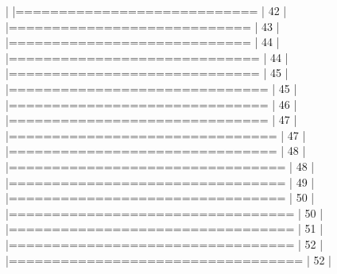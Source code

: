 \documentclass[10pt]{article}
\newenvironment{CodeChunk}{}{}
\begin{document}
\begin{CodeChunk}
\begin{CodeChunk}
\begin{CodeOutput}
  |                                                                       
  |============================                                     |  42%
  |                                                                       
  |============================                                     |  43%
  |                                                                       
  |============================                                     |  44%
  |                                                                       
  |=============================                                    |  44%
  |                                                                       
  |=============================                                    |  45%
  |                                                                       
  |==============================                                   |  45%
  |                                                                       
  |==============================                                   |  46%
  |                                                                       
  |==============================                                   |  47%
  |                                                                       
  |===============================                                  |  47%
  |                                                                       
  |===============================                                  |  48%
  |                                                                       
  |================================                                 |  48%
  |                                                                       
  |================================                                 |  49%
  |                                                                       
  |================================                                 |  50%
  |                                                                       
  |=================================                                |  50%
  |                                                                       
  |=================================                                |  51%
  |                                                                       
  |=================================                                |  52%
  |                                                                       
  |==================================                               |  52%
  |                                                                       

\end{CodeOutput}
\end{CodeChunk}
\end{CodeChunk}
\end{document}
